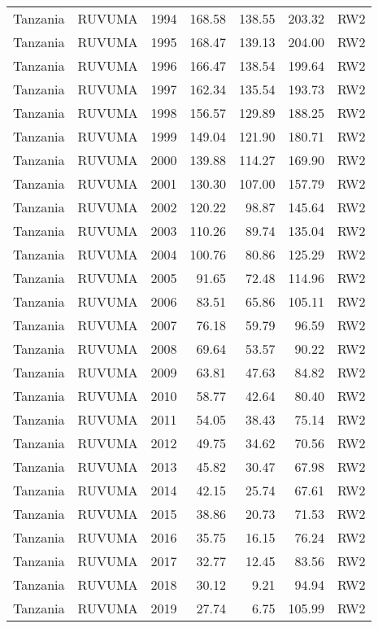 \begin{longtable}{lllrrrl}
  Tanzania & RUVUMA & 1994 & 168.58 & 138.55 & 203.32 & RW2 \\ 
  Tanzania & RUVUMA & 1995 & 168.47 & 139.13 & 204.00 & RW2 \\ 
  Tanzania & RUVUMA & 1996 & 166.47 & 138.54 & 199.64 & RW2 \\ 
  Tanzania & RUVUMA & 1997 & 162.34 & 135.54 & 193.73 & RW2 \\ 
  Tanzania & RUVUMA & 1998 & 156.57 & 129.89 & 188.25 & RW2 \\ 
  Tanzania & RUVUMA & 1999 & 149.04 & 121.90 & 180.71 & RW2 \\ 
  Tanzania & RUVUMA & 2000 & 139.88 & 114.27 & 169.90 & RW2 \\ 
  Tanzania & RUVUMA & 2001 & 130.30 & 107.00 & 157.79 & RW2 \\ 
  Tanzania & RUVUMA & 2002 & 120.22 & 98.87 & 145.64 & RW2 \\ 
  Tanzania & RUVUMA & 2003 & 110.26 & 89.74 & 135.04 & RW2 \\ 
  Tanzania & RUVUMA & 2004 & 100.76 & 80.86 & 125.29 & RW2 \\ 
  Tanzania & RUVUMA & 2005 & 91.65 & 72.48 & 114.96 & RW2 \\ 
  Tanzania & RUVUMA & 2006 & 83.51 & 65.86 & 105.11 & RW2 \\ 
  Tanzania & RUVUMA & 2007 & 76.18 & 59.79 & 96.59 & RW2 \\ 
  Tanzania & RUVUMA & 2008 & 69.64 & 53.57 & 90.22 & RW2 \\ 
  Tanzania & RUVUMA & 2009 & 63.81 & 47.63 & 84.82 & RW2 \\ 
  Tanzania & RUVUMA & 2010 & 58.77 & 42.64 & 80.40 & RW2 \\ 
  Tanzania & RUVUMA & 2011 & 54.05 & 38.43 & 75.14 & RW2 \\ 
  Tanzania & RUVUMA & 2012 & 49.75 & 34.62 & 70.56 & RW2 \\ 
  Tanzania & RUVUMA & 2013 & 45.82 & 30.47 & 67.98 & RW2 \\ 
  Tanzania & RUVUMA & 2014 & 42.15 & 25.74 & 67.61 & RW2 \\ 
  Tanzania & RUVUMA & 2015 & 38.86 & 20.73 & 71.53 & RW2 \\ 
  Tanzania & RUVUMA & 2016 & 35.75 & 16.15 & 76.24 & RW2 \\ 
  Tanzania & RUVUMA & 2017 & 32.77 & 12.45 & 83.56 & RW2 \\ 
  Tanzania & RUVUMA & 2018 & 30.12 & 9.21 & 94.94 & RW2 \\ 
  Tanzania & RUVUMA & 2019 & 27.74 & 6.75 & 105.99 & RW2 \\ 

\end{longtable}
